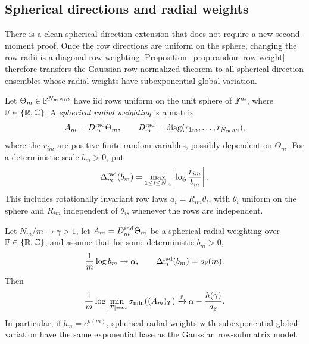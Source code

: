 \subsection{Spherical directions and radial weights}

There is a clean spherical-direction extension that does not require a new
second-moment proof.  Once the row directions are uniform on the sphere, changing
the row radii is a diagonal row weighting.  Proposition~\ref{prop:random-row-weight}
therefore transfers the Gaussian row-normalized theorem to all spherical
direction ensembles whose radial weights have subexponential global variation.

\begin{definition}\label{def:rot-inv}
Let \(\Theta_m\in\mathbb{F}^{N_m\times m}\) have iid rows uniform on the unit sphere of
\(\mathbb{F}^m\), where \(\mathbb{F}\in\{\mathbb{R},\mathbb{C}\}\).  A \emph{spherical radial weighting} is a
matrix
\[
  A_m=D_m^{\rm rad}\Theta_m,\qquad
  D_m^{\rm rad}=\operatorname{diag}(r_{1m},\ldots,r_{N_m,m}),
\]
where the \(r_{im}\) are positive finite random variables, possibly dependent on
\(\Theta_m\).  For a deterministic scale \(b_m>0\), put
\[
  \Delta_m^{\rm rad}(b_m)
  =\max_{1\le i\le N_m}\left|\log\frac{r_{im}}{b_m}\right|.
\]
This includes rotationally invariant row laws \(a_i=R_{im}\theta_i\), with
\(\theta_i\) uniform on the sphere and \(R_{im}\) independent of \(\theta_i\),
whenever the rows are independent.
\end{definition}

\begin{theorem}\label{thm:rot-inv-univ}
Let \(N_m/m\to\gamma>1\), let \(A_m=D_m^{\rm rad}\Theta_m\) be a spherical radial
weighting over \(\mathbb{F}\in\{\mathbb{R},\mathbb{C}\}\), and assume that for some deterministic
\(b_m>0\),
\[
  \frac{1}{m}\log b_m\to\alpha,
  \qquad
  \Delta_m^{\rm rad}(b_m)=o_{\mathbb{P}}(m).
\]
Then
\[
  \frac1m\log\min_{|T|=m}\sigma_{\min}((A_m)_T)
  \xrightarrow{\mathbb{P}}
  \alpha-\frac{h(\gamma)}{d_{\mathbb{F}}}.
\]
In particular, if \(b_m=e^{o(m)}\), spherical radial weights with
subexponential global variation have the same exponential base as the Gaussian
row-submatrix model.
\end{theorem}

